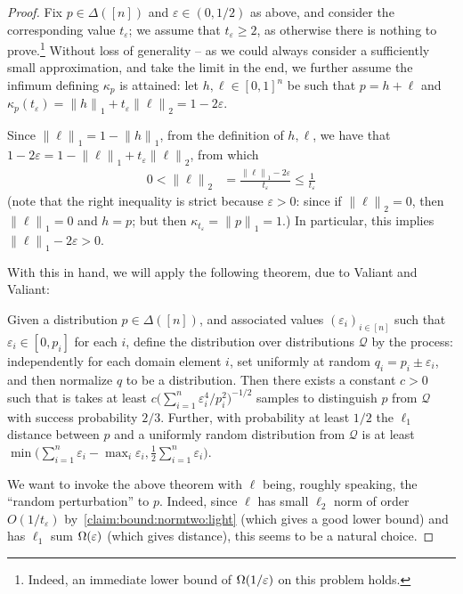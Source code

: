 \documentclass[11pt]{article}
\theoremstyle{remark}   	\newtheorem{remark}[theorem]{Remark}
\theoremstyle{definition}   	\newaliascnt{defn}{theorem}
\newcommand{\eps}{\ensuremath{\varepsilon}\xspace}
\newcommand{\domain}[1][{[n]}]{\ensuremath{#1}\xspace} \newcommand{\distribs}[1]{\Delta\!\left(#1\right)} \newcommand{\yes}{{\sf{}yes}\xspace}
\newcommand{\bigOmega}[1]{{\Omega\mleft( #1 \mright)}}
\newcommand{\norm}[1]{\lVert#1{\rVert}}
\newcommand{\normone}[1]{{\norm{#1}}_1}
\newcommand{\normtwo}[1]{{\norm{#1}}_2}
\newcommand{\lp}[1][1]{\ell_{#1}}
\newcommand{\kf}[1]{\kappa_{#1}}
\begin{document}
\begin{proof}
Fix $p\in\distribs{\domain}$ and $\eps\in(0,1/2)$ as above, and consider the corresponding value $t_\eps$; we assume that $t_\eps \geq 2$, as otherwise there is nothing to prove.\footnote{Indeed, an immediate lower bound of $\bigOmega{1/\eps}$ on this problem holds.} Without loss of generality -- as we could always consider a sufficiently small approximation, and take the limit in the end, we further assume the infimum defining $\kf{p}$ is attained: let $h,\ell\in[0,1]^n$ be such that $p=h+\ell$ and $\kf{p}(t_\eps) = \normone{h}+ t_\eps\normtwo{\ell} = 1-2\eps$.

Since $\normone{\ell} = 1-\normone{h}$, from the definition of $h,\ell$, we have that
$
    1-2\eps = 1-\normone{\ell}+ t_\eps\normtwo{\ell}
$, 
from which
\begin{align}
  0 < \normtwo{\ell} &= \frac{\normone{\ell}-2\eps}{t_\eps} \leq \frac{1}{t_\eps} \label{claim:bound:normtwo:light}
\end{align}
(note that the right inequality is strict because $\eps>0$: since if $\normtwo{\ell} = 0$, then $\normone{\ell}=0$ and $h=p$; but then $\kf{t_\eps} = \normone{p}=1$.) In particular, this implies $\normone{\ell}-2\eps > 0$.

With this in hand, we will apply the following theorem, due to Valiant and Valiant:
\begin{theorem}[{\cite[Theorem 4]{VV:14}}]\label{theo:vv:14:blackbox}
  Given a distribution $p\in\distribs{\domain}$, and associated values $(\eps_i)_{i\in[n]}$ such that $\eps_i\in[0,p_i]$ for each $i$, define the distribution over distributions $\mathcal{Q}$ by the process: independently for each domain element $i$, set uniformly at random $q_i = p_i \pm \eps_i$, and then normalize $q$ to be a distribution. Then there exists a constant $c>0$ such that is takes at least $c\big(\sum_{i=1}^n {\eps_i^4}/{p_i^2}\big)^{-1/2}$ samples to distinguish $p$ from $\mathcal{Q}$ with success probability $2/3$. Further, with probability at least $1/2$ the $\lp[1]$ distance between $p$ and a uniformly random distribution from $\mathcal{Q}$ is at least $\min\big(\sum_{i=1}^n \eps_i - \max_i \eps_i, \frac{1}{2}\sum_{i=1}^n \eps_i\big)$.
\end{theorem}

We want to invoke the above theorem with $\ell$ being, roughly speaking, the ``random perturbation'' to $p$. Indeed, since $\ell$ has small $\lp[2]$ norm of order $O(1/t_\eps)$ by~\eqref{claim:bound:normtwo:light} (which gives a good lower bound) and has $\lp[1]$ sum $\bigOmega{\eps}$ (which gives distance), this seems to be a natural choice.


\end{proof}
\end{document}
